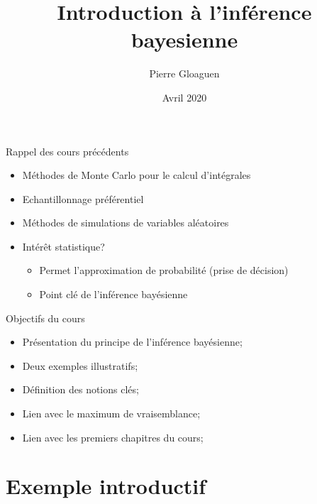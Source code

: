 \documentclass[9pt,ignorenonframetext,]{beamer}
\title{Introduction à l'inférence bayesienne}
\author{Pierre Gloaguen}
\date{Avril 2020}
\providecommand{\tightlist}{%
  \setlength{\itemsep}{0pt}\setlength{\parskip}{0pt}}
\begin{document}
\frame{\titlepage}

\begin{frame}{Rappel des cours précédents}
\protect\hypertarget{rappel-des-cours-pruxe9cuxe9dents}{}

\begin{itemize}
\tightlist
\item
  Méthodes de Monte Carlo pour le calcul d'intégrales
\item
  Echantillonnage préférentiel
\item
  Méthodes de simulations de variables aléatoires \pause
\item
  Intérêt statistique?

  \begin{itemize}
  \tightlist
  \item
    Permet l'approximation de probabilité (prise de décision)
  \item
    Point clé de l'inférence bayésienne
  \end{itemize}
\end{itemize}

\end{frame}

\begin{frame}{Objectifs du cours}
\protect\hypertarget{objectifs-du-cours}{}

\begin{itemize}
\tightlist
\item
  Présentation du principe de l'inférence bayésienne;
\item
  Deux exemples illustratifs;
\item
  Définition des notions clés;\pause
\item
  Lien avec le maximum de vraisemblance;
\item
  Lien avec les premiers chapitres du cours;
\end{itemize}

\end{frame}

\hypertarget{exemple-introductif}{%
\section{Exemple introductif}\label{exemple-introductif}}
\end{document}
